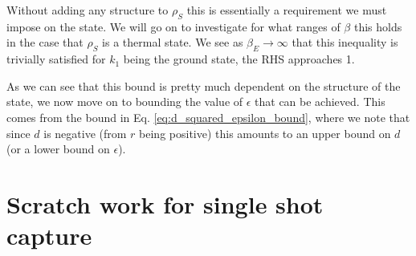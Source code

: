 \documentclass{article}
\begin{document}
Without adding any structure to $\rho_S$ this is essentially a requirement we must impose on the state. We will go on to investigate for what ranges of $\beta$ this holds in the case that $\rho_S$ is a thermal state. We see as $\beta_E \to \infty$ that this inequality is trivially satisfied for $k_1$ being the ground state, the RHS approaches 1.

As we can see that this bound is pretty much dependent on the structure of the state, we now move on to bounding the value of $\epsilon$ that can be achieved. This comes from the bound in Eq. \eqref{eq:d_squared_epsilon_bound}, where we note that since $d$ is negative (from $r$ being positive) this amounts to an upper bound on $d$ (or a lower bound on $\epsilon$).



\section{Scratch work for single shot capture}
\end{document}
